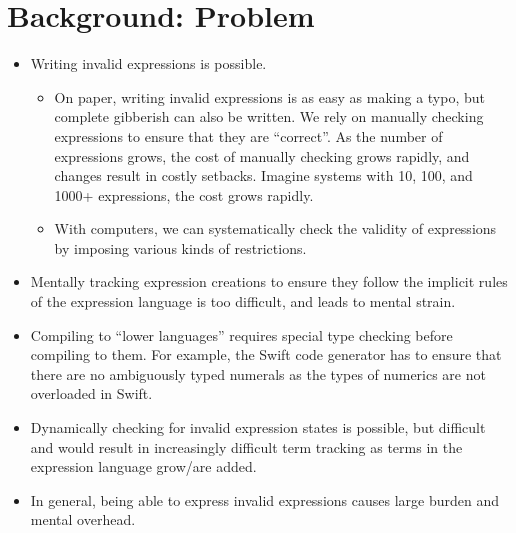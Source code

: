 \section{Background: Problem}

\begin{itemize}

      \item Writing invalid expressions is possible.
            \begin{itemize}

                  \item On paper, writing invalid expressions is as easy as
                        making a typo, but complete gibberish can also be
                        written. We rely on manually checking expressions to
                        ensure that they are ``correct''. As the number of
                        expressions grows, the cost of manually checking grows
                        rapidly, and changes result in costly setbacks. Imagine
                        systems with 10, 100, and 1000+ expressions, the cost
                        grows rapidly.

                  \item With computers, we can systematically check the validity
                        of expressions by imposing various kinds of
                        restrictions.

            \end{itemize}

      \item Mentally tracking expression creations to ensure they follow the
            implicit rules of the expression language is too difficult, and
            leads to mental strain.

      \item Compiling to ``lower languages'' requires special type checking
            before compiling to them. For example, the Swift code generator has
            to ensure that there are no ambiguously typed numerals as the types
            of numerics are not overloaded in Swift.

      \item Dynamically checking for invalid expression states is possible, but
            difficult and would result in increasingly difficult term tracking
            as terms in the expression language grow/are added.

      \item In general, being able to express invalid expressions causes large
            burden and mental overhead.

\end{itemize}


